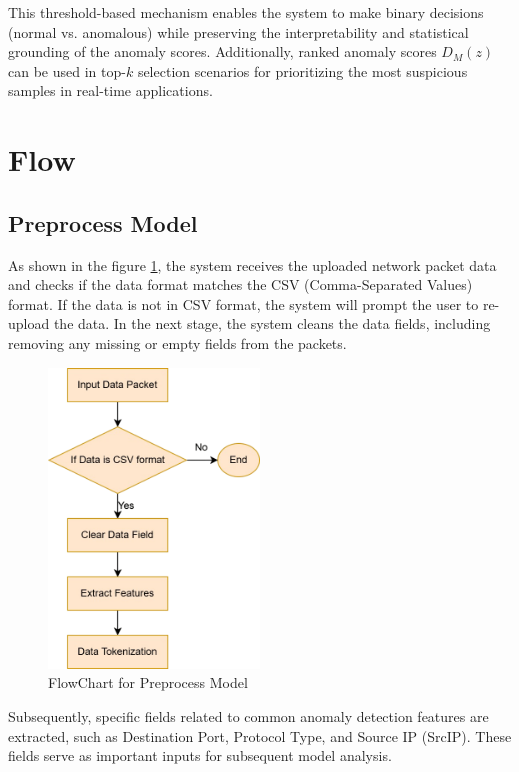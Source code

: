 \begin{ZhChapter}
    This threshold-based mechanism enables the system to make binary decisions (normal vs. anomalous) while preserving the interpretability and statistical grounding of the anomaly scores. Additionally, ranked anomaly scores $D_M(z)$ can be used in top-$k$ selection scenarios for prioritizing the most suspicious samples in real-time applications.







    \section{Flow} %
    \subsection{Preprocess Model}
    As shown in the figure \ref{fig:FlowChart}, the system receives the uploaded network packet data and checks if the data format matches the CSV (Comma-Separated Values) format. If the data is not in CSV format, the system will prompt the user to re-upload the data. In the next stage, the system cleans the data fields, including removing any missing or empty fields from the packets.
    \begin{figure}[htbp]
        \centering
        \includegraphics[width = 0.5\textwidth]{image/FlowChart.jpg}
        \caption{FlowChart for Preprocess Model}
        \label{fig:FlowChart}
    \end{figure}

    Subsequently, specific fields related to common anomaly detection features are extracted, such as Destination Port, Protocol Type, and Source IP (SrcIP). These fields serve as important inputs for subsequent model analysis.


\end{ZhChapter}
